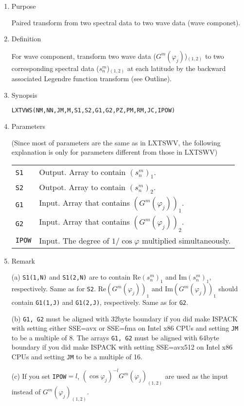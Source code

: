 \documentclass[a4paper]{scrartcl}
\begin{document}
\begin{enumerate}  

\item Purpose

Paired transform from two spectral data to two wave data (wave componet).

\item Definition

For wave component, transform two wave data ($G^m(\varphi_j)$)$_{(1,2)}$
to two corresponding spectral data ($s^m_n$)$_{(1,2)}$ at each latitude
by the backward associated Legendre function transform (see Outline).

\item Synopsis 
  

\texttt{LXTVWS(NM,NN,JM,M,S1,S2,G1,G2,PZ,PM,RM,JC,IPOW)}
  
\item Parameters

(Since most of parameters are the same as in LXTSWV,
the following explanation is only for parameters
different from those in LXTSWV)
  
\begin{tabular}{ll}
\texttt{S1} & Output. Array to contain $(s^m_n)_1$.\\
\texttt{S2} & Outpot. Array to contain $(s^m_n)_2$.\\
\texttt{G1} & Input. Array that contains $(G^m(\varphi_j))_1$.\\
\texttt{G2} & Input. Array that contains $(G^m(\varphi_j))_2$.\\
\texttt{IPOW} & Input. 
The degree of $1/\cos\varphi$ multiplied 
simultaneously.\\
\end{tabular}

\item Remark

  (a) \texttt{S1(1,N)} and \texttt{S1(2,N)}
are to contain
$\mbox{Re}(s^m_n)_1$ and $\mbox{Im}(s^m_n)_1$, respectively.
Same as for \texttt{S2}.
$\mbox{Re}(G^m(\varphi_j))_1$ and 
$\mbox{Im}(G^m(\varphi_j))_1$ should 
contain
\texttt{G1(1,J)} and \texttt{G1(2,J)}, respectively.
Same as for \texttt{G2}.

(b) \texttt{G1, G2}
must be aligned with 32byte boundary
if you did make ISPACK with setting either SSE=avx or SSE=fma
on Intel x86 CPUs and setting \texttt{JM} to be a multiple of 8.
The arrays \texttt{G1, G2} must be aligned with 64byte boundary
if you did make ISPACK with setting SSE=avx512
on Intel x86 CPUs and setting \texttt{JM} to be a multiple of 16.

(c) If you set \texttt{IPOW}$=l$, 
$(\cos\varphi_j)^{-l}G^m(\varphi_j)_{(1,2)}$ are used as the input
instead of $G^m(\varphi_j)_{(1,2)}$.

\end{enumerate}
\end{document}
